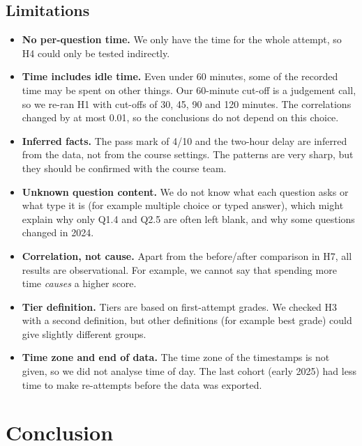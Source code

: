 \subsection{Limitations}

\begin{itemize}
  \item \textbf{No per-question time.} We only have the time for the whole
        attempt, so H4 could only be tested indirectly.
  \item \textbf{Time includes idle time.} Even under 60 minutes, some of the
        recorded time may be spent on other things. Our 60-minute cut-off is a
        judgement call, so we re-ran H1 with cut-offs of 30, 45, 90 and 120
        minutes. The correlations changed by at most 0.01, so the conclusions
        do not depend on this choice.
  \item \textbf{Inferred facts.} The pass mark of 4/10 and the two-hour delay
        are inferred from the data, not from the course settings. The
        patterns are very sharp, but they should be confirmed with the course
        team.
  \item \textbf{Unknown question content.} We do not know what each question
        asks or what type it is (for example multiple choice or typed answer),
        which might explain why only Q1.4 and Q2.5 are often left blank, and why
        some questions changed in 2024.
  \item \textbf{Correlation, not cause.} Apart from the before/after comparison
        in H7, all results are observational. For example, we cannot say that
        spending more time \emph{causes} a higher score.
  \item \textbf{Tier definition.} Tiers are based on first-attempt grades. We
        checked H3 with a second definition, but other definitions (for example
        best grade) could give slightly different groups.
  \item \textbf{Time zone and end of data.} The time zone of the timestamps is
        not given, so we did not analyse time of day. The last cohort (early
        2025) had less time to make re-attempts before the data was exported.
\end{itemize}

\section{Conclusion}
\label{sec:conclusion}


